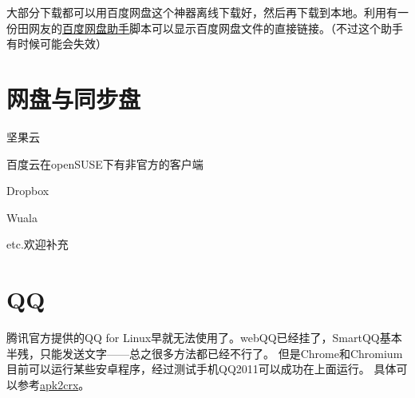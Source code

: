 大部分下载都可以用百度网盘这个神器离线下载好，然后再下载到本地。利用有一份田网友的\href{http://git.oschina.net/youyifentian/dupanlink}{百度网盘助手}脚本可以显示百度网盘文件的直接链接。（不过这个助手有时候可能会失效）
\section{网盘与同步盘}
\begin{compactitem}
 \item 坚果云
 \item 百度云在openSUSE下有非官方的客户端
 \item Dropbox
 \item Wuala
 \item etc.欢迎补充
\end{compactitem}
\section{QQ}
腾讯官方提供的QQ for Linux早就无法使用了。webQQ已经挂了，SmartQQ基本半残，只能发送文字——总之很多方法都已经不行了。
但是Chrome和Chromium目前可以运行某些安卓程序，经过测试手机QQ2011可以成功在上面运行。
具体可以参考\href{http://huodong.ustc.edu.cn/Crx}{apk2crx}。